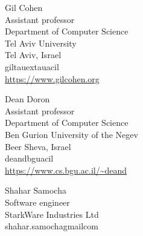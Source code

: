 \documentclass{toc}
\begin{document}
%
%
%
%
%
\begin{tocauthors}
\begin{tocinfo}[cohen]
 Gil Cohen\\
 Assistant professor\\
 Department of Computer Science\\
 Tel Aviv University\\
 Tel Aviv, Israel\\
 gil\tocat{}tauex\tocdot{}tau\tocdot{}ac\tocdot{}il \\   %
 \url{https://www.gilcohen.org}    %
\end{tocinfo}
\begin{tocinfo}[doron]
 Dean Doron\\
 Assistant professor\\
 Department of Computer Science\\
 Ben Gurion University of the Negev\\
 Beer Sheva, Israel\\
 deand\tocat{}bgu\tocdot{}ac\tocdot{}il \\   %
 \url{https://www.cs.bgu.ac.il/~deand}      %
\end{tocinfo}
\begin{tocinfo}[samocha]
 Shahar Samocha\\
 Software engineer\\
StarkWare Industries Ltd \\
shahar.samocha\tocat{}gmail\tocdot{}com    %
\end{tocinfo}
\end{tocauthors}
\end{document}
